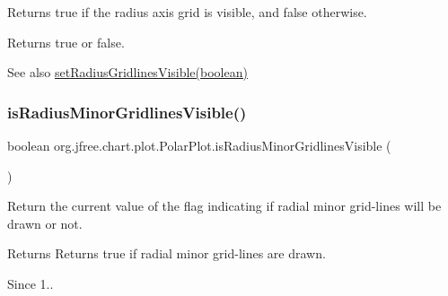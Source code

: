 Returns {\ttfamily true} if the radius axis grid is visible, and {\ttfamily false} otherwise.

\begin{DoxyReturn}{Returns}
{\ttfamily true} or {\ttfamily false}.
\end{DoxyReturn}
\begin{DoxySeeAlso}{See also}
\mbox{\hyperlink{classorg_1_1jfree_1_1chart_1_1plot_1_1_polar_plot_ad0accbd7efb89fbc9cd9db8a5e344e8d}{set\+Radius\+Gridlines\+Visible(boolean)}} 
\end{DoxySeeAlso}
\mbox{\label{classorg_1_1jfree_1_1chart_1_1plot_1_1_polar_plot_a30132532bfe024fa2e0b08fea5bd4f88}} 
\subsubsection{\texorpdfstring{is\+Radius\+Minor\+Gridlines\+Visible()}{isRadiusMinorGridlinesVisible()}}
{\footnotesize\ttfamily boolean org.\+jfree.\+chart.\+plot.\+Polar\+Plot.\+is\+Radius\+Minor\+Gridlines\+Visible (\begin{DoxyParamCaption}{ }\end{DoxyParamCaption})}

Return the current value of the flag indicating if radial minor grid-\/lines will be drawn or not.

\begin{DoxyReturn}{Returns}
Returns {\ttfamily true} if radial minor grid-\/lines are drawn. 
\end{DoxyReturn}
\begin{DoxySince}{Since}
1.. 
\end{DoxySince}
\mbox{\label{classorg_1_1jfree_1_1chart_1_1plot_1_1_polar_plot_a82c166269eb7715eec2faa1f042616be}} 
